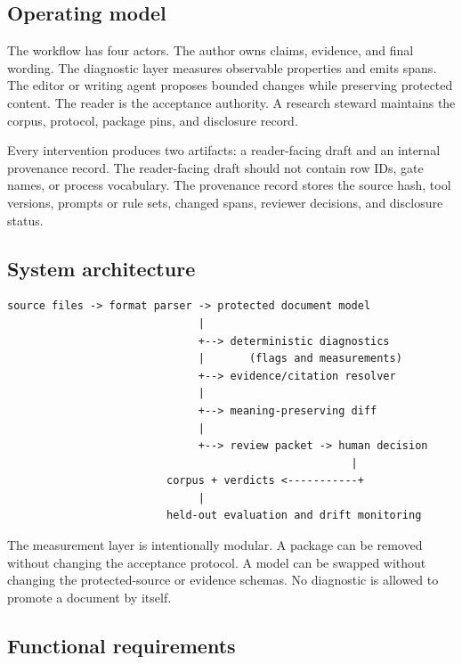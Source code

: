 \documentclass[11pt]{article}
\begin{document}
\hypertarget{operating-model}{%
\subsection{Operating model}\label{operating-model}}

The workflow has four actors. The author owns claims, evidence, and final wording. The diagnostic layer measures observable properties and emits spans. The editor or writing agent proposes bounded changes while preserving protected content. The reader is the acceptance authority. A research steward maintains the corpus, protocol, package pins, and disclosure record.

Every intervention produces two artifacts: a reader-facing draft and an internal provenance record. The reader-facing draft should not contain row IDs, gate names, or process vocabulary. The provenance record stores the source hash, tool versions, prompts or rule sets, changed spans, reviewer decisions, and disclosure status.

\hypertarget{system-architecture}{%
\subsection{System architecture}\label{system-architecture}}

\begin{verbatim}
source files -> format parser -> protected document model
                              |
                              +--> deterministic diagnostics
                              |       (flags and measurements)
                              +--> evidence/citation resolver
                              |
                              +--> meaning-preserving diff
                              |
                              +--> review packet -> human decision
                                                      |
                         corpus + verdicts <-----------+
                              |
                         held-out evaluation and drift monitoring
\end{verbatim}

The measurement layer is intentionally modular. A package can be removed without changing the acceptance protocol. A model can be swapped without changing the protected-source or evidence schemas. No diagnostic is allowed to promote a document by itself.

\hypertarget{functional-requirements}{%
\subsection{Functional requirements}\label{functional-requirements}}
\end{document}
